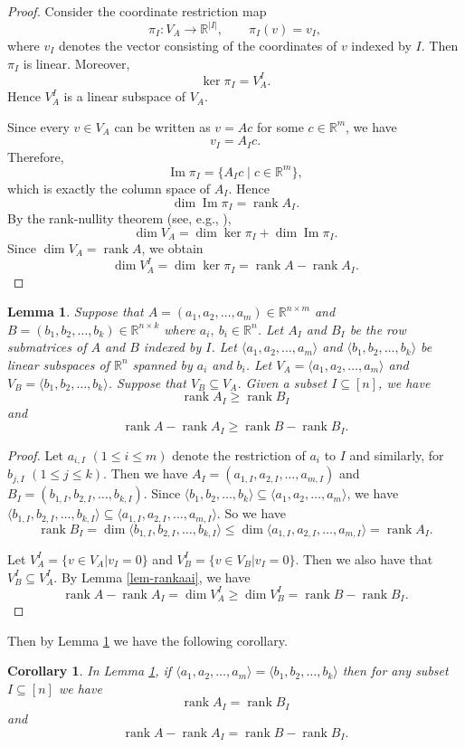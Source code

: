 \documentclass[reqno]{amsart}
\newtheorem{corollary}[theorem]{Corollary}
\newtheorem{lemma}[theorem]{Lemma}
\theoremstyle{definition}
\numberwithin{equation}{section}
\theoremstyle{remark}
\begin{document}
\begin{proof}
Consider the coordinate restriction map
$$\pi_I:V_A\longrightarrow \mathbb{R}^{|I|},\qquad \pi_I(v)=v_I,$$
where $v_I$ denotes the vector consisting of the coordinates of $v$
indexed by $I$. Then $\pi_I$ is linear. Moreover,
$$\ker \pi_I=V_A^I.$$
Hence $V_A^I$ is a linear subspace of $V_A$.

Since every $v\in V_A$ can be written as $v=A c$
for some $c\in\mathbb{R}^m$, we have
$$v_I=A_I c.$$
Therefore,
$$\operatorname{Im}\pi_I=\{A_I c \mid c\in\mathbb{R}^m\},$$
which is exactly the column space of $A_I$. Hence
$$\dim \operatorname{Im}\pi_I=\operatorname{rank} A_I.$$
By the rank-nullity theorem (see, e.g., \cite[Thm 4.1.6]{artin11}),
$$\dim V_A=\dim \ker\pi_I+\dim\operatorname{Im}\pi_I.$$
Since $\dim V_A=\operatorname{rank} A$, we obtain
$$\dim V_A^I=\dim\ker\pi_I=\operatorname{rank} A-\operatorname{rank} A_I.$$
\end{proof}


\begin{lemma}\label{lem-subfull}
Suppose that $A=(a_1,a_2,\ldots,a_m)\in \mathbb{R}^{n\times m}$  and  $B=(b_1,b_2,\ldots,b_k)\in \mathbb{R}^{n\times k}$ where $a_i,~b_i\in \mathbb{R}^{n}$. Let $A_I$ and $B_I$ be the row submatrices of $A$ and $B$
indexed by $I$. Let $\langle a_1,a_2,\ldots,a_m \rangle$ and $\langle b_1,b_2,\ldots,b_k \rangle$ be linear subspaces of $\mathbb{R}^{n}$ spanned by $a_i$ and $b_i$. Let $V_A=\langle a_1,a_2,\ldots,a_m \rangle$ and 
 $V_B=\langle b_1,b_2,\ldots,b_k \rangle$. Suppose that $V_B\subseteq V_A$. Given a subset $I\subseteq [n]$, we have
$$\operatorname{rank}A_I\geq \operatorname{rank}B_I$$
and
$$\operatorname{rank}A-\operatorname{rank}A_I\geq \operatorname{rank}B-\operatorname{rank}B_I.$$
\end{lemma}
\begin{proof}
Let $a_{i,I}$ $(1\leq i\leq m)$ denote the restriction of $a_i$ to $I$ and similarly, for $b_{j,I}$ $(1\leq j\leq k)$. Then we have $A_I=(a_{1,I}, a_{2,I},\ldots,a_{m,I})$ and $B_I=(b_{1,I}, b_{2,I},\ldots,b_{k,I})$.
Since $\langle b_1,b_2,\ldots,b_k \rangle\subseteq \langle a_1,a_2,\ldots,a_m \rangle$, we have $\langle b_{1,I},b_{2,I},\ldots,
b_{k,I} \rangle\subseteq \langle a_{1,I},a_{2,I},\ldots,a_{m,I} \rangle$.
So we have
$$\operatorname{rank}B_I=\dim \langle b_{1,I},b_{2,I},\ldots,
b_{k,I} \rangle 
\leq \dim \langle a_{1,I},a_{2,I},\ldots,a_{m,I} \rangle=\operatorname{rank}A_I.$$

Let $V_A^I=\{v\in V_A| v_I=0 \}$ and $V_B^I=\{v\in V_B| v_I=0 \}$. Then we also have that $V_B^I\subseteq V_A^I$. By Lemma \ref{lem-rankaai}, we have $$ \operatorname{rank}A-\operatorname{rank}A_I=\dim V_A^I \geq \dim V_B^I=\operatorname{rank}B-\operatorname{rank}B_I.$$
\end{proof}
Then by Lemma \ref{lem-subfull} we have the following corollary.
\begin{corollary}\label{cor-subfull}
In Lemma \ref{lem-subfull},
if $\langle a_1,a_2,\ldots,a_m \rangle=\langle b_1,b_2,\ldots,b_k \rangle$ then for any subset $I\subseteq [n]$ we have
$$\operatorname{rank}A_I=\operatorname{rank}B_I$$
and  
$$\operatorname{rank}A-\operatorname{rank}A_I= \operatorname{rank}B-\operatorname{rank}B_I.$$
\end{corollary}
\end{document}
